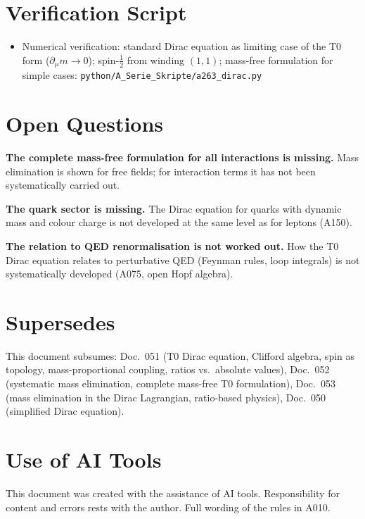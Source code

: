\section{Verification Script}

\begin{itemize}[leftmargin=2em,itemsep=2pt,topsep=2pt]
  \item Numerical verification: standard Dirac equation as limiting case of the T0
    form ($\partial_\mu m\to0$); spin-$\tfrac12$ from winding $(1,1)$; mass-free
    formulation for simple cases:
    \texttt{python/A\_Serie\_Skripte/a263\_dirac.py}
\end{itemize}

\section{Open Questions}

\textbf{The complete mass-free formulation for all interactions is missing.} Mass
elimination is shown for free fields; for interaction terms it has not been
systematically carried out.

\textbf{The quark sector is missing.} The Dirac equation for quarks with dynamic
mass and colour charge is not developed at the same level as for leptons (A150).

\textbf{The relation to QED renormalisation is not worked out.} How the T0 Dirac
equation relates to perturbative QED (Feynman rules, loop integrals) is not
systematically developed (A075, open Hopf algebra).

\section{Supersedes}

This document subsumes: Doc.~051 (T0 Dirac equation, Clifford algebra, spin as
topology, mass-proportional coupling, ratios vs.\ absolute values), Doc.~052
(systematic mass elimination, complete mass-free T0 formulation), Doc.~053 (mass
elimination in the Dirac Lagrangian, ratio-based physics), Doc.~050 (simplified
Dirac equation).

\section{Use of AI Tools}

This document was created with the assistance of AI tools. Responsibility
for content and errors rests with the author. Full wording of the rules in A010.
